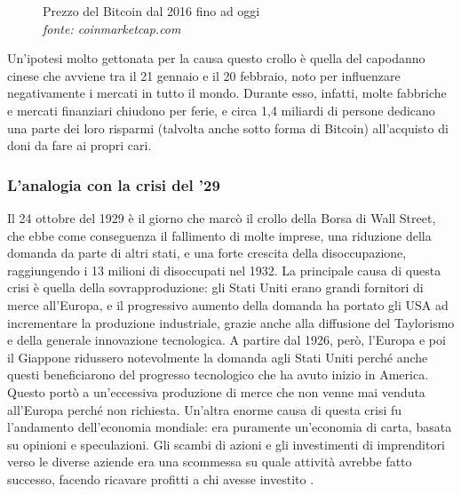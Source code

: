 \documentclass {article}
\begin{document}
\vspace {0.5cm}
\begin{figure}[htb!]
\centering
\caption {Prezzo del Bitcoin dal 2016 fino ad oggi\\\textit{fonte: coinmarketcap.com}}
\end{figure}
\vspace {0.2cm}
\noindent
%
Un'ipotesi molto gettonata per la causa questo crollo è quella del capodanno cinese che avviene tra il 21 gennaio e il 20 febbraio, noto per influenzare negativamente i mercati in tutto il mondo.
Durante esso, infatti, molte fabbriche e mercati finanziari chiudono per ferie, e circa 1,4 miliardi di persone dedicano una parte dei loro risparmi (talvolta anche sotto forma di Bitcoin) all'acquisto di doni da fare ai propri cari.


\subsubsection {L'analogia con la crisi del '29}


Il 24 ottobre del 1929 è il giorno che marcò il crollo della Borsa di Wall Street, che ebbe come conseguenza il fallimento di molte imprese, una riduzione della domanda da parte di altri stati, e una forte crescita della disoccupazione, raggiungendo i 13 milioni di disoccupati nel 1932.
La principale causa di questa crisi è quella della sovrapproduzione: gli Stati Uniti erano grandi fornitori di merce all'Europa, e il progressivo aumento della domanda ha portato gli USA ad incrementare la produzione industriale, grazie anche alla diffusione del Taylorismo e della generale innovazione tecnologica.
A partire dal 1926, però, l'Europa e poi il Giappone ridussero notevolmente la domanda agli Stati Uniti perché anche questi beneficiarono del progresso tecnologico che ha avuto inizio in America.
Questo portò a un'eccessiva produzione di merce che non venne mai venduta all'Europa perché non richiesta.
Un'altra enorme causa di questa crisi fu l'andamento dell'economia mondiale: era puramente un'economia di carta, basata su opinioni e speculazioni.
Gli scambi di azioni e gli investimenti di imprenditori verso le diverse aziende era una scommessa su quale attività avrebbe fatto successo, facendo ricavare profitti a chi avesse investito \cite{crisi29}.
\end{document}
